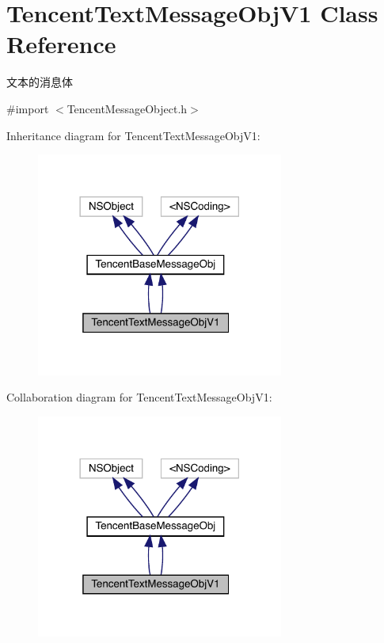 \hypertarget{interface_tencent_text_message_obj_v1}{}\section{Tencent\+Text\+Message\+Obj\+V1 Class Reference}
\label{interface_tencent_text_message_obj_v1}


文本的消息体  




{\ttfamily \#import $<$Tencent\+Message\+Object.\+h$>$}



Inheritance diagram for Tencent\+Text\+Message\+Obj\+V1\+:\nopagebreak
\begin{figure}[H]
\begin{center}
\leavevmode
\includegraphics[width=230pt]{interface_tencent_text_message_obj_v1__inherit__graph}
\end{center}
\end{figure}


Collaboration diagram for Tencent\+Text\+Message\+Obj\+V1\+:\nopagebreak
\begin{figure}[H]
\begin{center}
\leavevmode
\includegraphics[width=230pt]{interface_tencent_text_message_obj_v1__coll__graph}
\end{center}
\end{figure}
